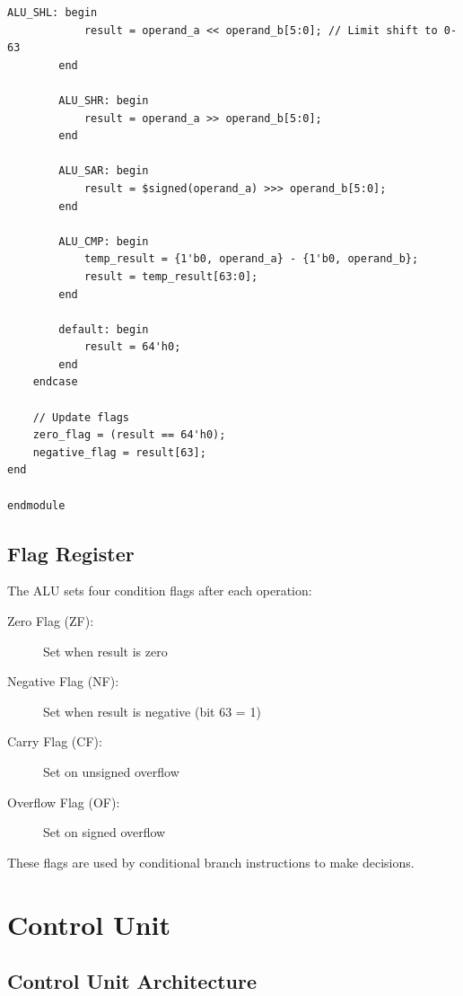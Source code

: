 \documentclass[12pt,a4paper,oneside]{book}
\begin{document}
\begin{lstlisting}[style=verilog, caption={ALU Implementation}, label={lst:alu}]
        ALU_SHL: begin
            result = operand_a << operand_b[5:0]; // Limit shift to 0-63
        end
        
        ALU_SHR: begin
            result = operand_a >> operand_b[5:0];
        end
        
        ALU_SAR: begin
            result = $signed(operand_a) >>> operand_b[5:0];
        end
        
        ALU_CMP: begin
            temp_result = {1'b0, operand_a} - {1'b0, operand_b};
            result = temp_result[63:0];
        end
        
        default: begin
            result = 64'h0;
        end
    endcase
    
    // Update flags
    zero_flag = (result == 64'h0);
    negative_flag = result[63];
end

endmodule
\end{lstlisting}

\section{Flag Register}

The ALU sets four condition flags after each operation:

\begin{description}
    \item[Zero Flag (ZF):] Set when result is zero
    \item[Negative Flag (NF):] Set when result is negative (bit 63 = 1)
    \item[Carry Flag (CF):] Set on unsigned overflow
    \item[Overflow Flag (OF):] Set on signed overflow
\end{description}

These flags are used by conditional branch instructions to make decisions.

\chapter{Control Unit}

\section{Control Unit Architecture}
\end{document}
